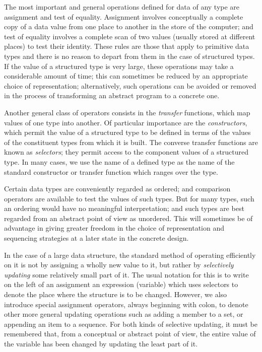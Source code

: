 The most important and general operations defined for data of any type are assignment and test of equality. Assignment involves conceptually a complete copy of a data value from one place to another in the store of the computer; and test of equality involves a complete scan of two values (usually stored at different places) to test their identity. These rules are those that apply to primitive data types and there is no reason to depart from them in the case of structured types. If the value of a structured type is very large, these operations may take a considerable amount of time; this can sometimes be reduced by an appropriate choice of representation; alternatively, such operations can be avoided or removed in the process of transforming an abstract program to a concrete one.

Another general class of operators consists in the \textit{transfer} functions, which map values of one type into another. Of particular importance are the \textit{constructors}, which permit the value of a structured type to be defined in terms of the values of the constituent types from which it is built. The converse transfer functions are known as \textit{selectors}; they permit access to the component values of a structured type. In many cases, we use the name of a defined type as the name of the standard constructor or transfer function which ranges over the type.

Certain data types are conveniently regarded as ordered; and comparison operators are available to test the values of such types. But for many types, such an ordering would have no meaningful interpretation; and such types are best regarded from an abstract point of view as unordered. This will sometimes be of advantage in giving greater freedom in the choice of representation and sequencing strategies at a later state in the concrete design.

In the case of a large data structure, the standard method of operating efficiently on it is not by assigning a wholly new value to it, but rather by \textit{selectively updating} some relatively small part of it. The usual notation for this is to write on the left of an assignment an expression (variable) which uses selectors to denote the place where the structure is to be changed. However, we also introduce special assignment operators, always beginning with colon, to denote other more general updating operations such as adding a member to a set, or appending an item to a sequence. For both kinds of selective updating, it must be remembered that, from a conceptual or abstract point of view, the entire value of the variable has been changed by updating the least part of it.

